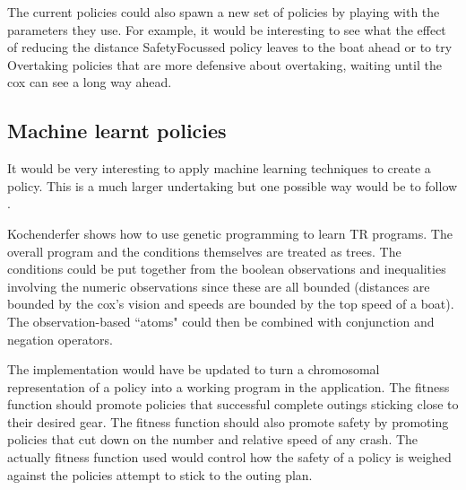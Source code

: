 The current policies could also spawn a new set of policies by playing with the parameters they use. For example, it would be interesting to see what the effect of reducing the distance SafetyFocussed policy leaves to the boat ahead or to try Overtaking policies that are more defensive about overtaking, waiting until the cox can see a long way ahead.

\subsection{Machine learnt policies}
It would be very interesting to apply machine learning techniques to create a policy. This is a much larger undertaking but one possible way would be to follow \textcite{Kochenderfer2003}. 

Kochenderfer shows how to use genetic programming to learn TR programs. The overall program and the conditions themselves are treated as trees. The conditions could be put together from the boolean observations and inequalities involving the numeric observations since these are all bounded (distances are bounded by the cox's vision and speeds are bounded by the top speed of a boat). The observation-based ``atoms" could then be combined with conjunction and negation operators. 

The implementation would have be updated to turn a chromosomal representation of a policy into a working program in the application. The fitness function should promote policies that successful complete outings sticking close to their desired gear. The fitness function should also promote safety by promoting policies that cut down on the number and relative speed of any crash. The actually fitness function used would control how the safety of a policy is weighed against the policies attempt to stick to the outing plan.

